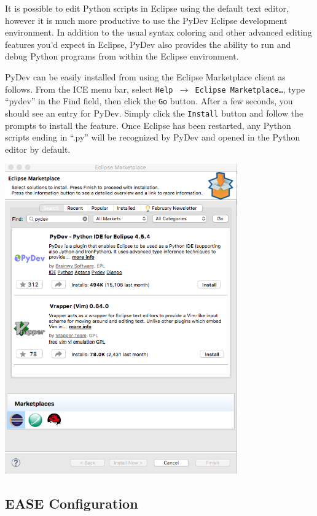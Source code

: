 \documentclass{article}
\begin{document}
It is possible to edit Python scripts in Eclipse using the default text editor,
however it is much more productive to use the PyDev Eclipse development
environment. In addition to the usual syntax coloring and other advanced editing
features you'd expect in Eclipse, PyDev also provides the ability to run and
debug Python programs from within the Eclipse environment.

PyDev can be easily installed from using the Eclipse Marketplace client as
follows. From the ICE menu bar, select \texttt{Help $\rightarrow$ Eclipse
Marketplace\ldots}, type ``pydev'' in the Find field, then click the \texttt{Go}
button.
After a few seconds, you should see an entry for PyDev. Simply click the
\texttt{Install} button and follow the prompts to install the feature. Once
Eclipse has been restarted, any Python scripts ending in ``.py'' will be recognized by
PyDev and opened in the Python editor by default.

\begin{center}
\includegraphics[width=10cm]{images/pydev-marketplace}
\end{center}

\subsection{EASE Configuration}
\end{document}
